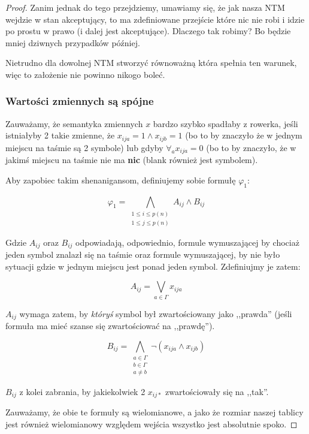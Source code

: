 \begin{proof}
    Zanim jednak do tego przejdziemy, umawiamy się, że jak nasza NTM wejdzie w stan akceptujący, to ma zdefiniowane przejście które nic nie robi i idzie po prostu w prawo (i dalej jest akceptujące). Dlaczego tak robimy? Bo będzie mniej dziwnych przypadków później. 
    
    Nietrudno dla dowolnej NTM stworzyć równoważną która spełnia ten warunek, więc to założenie nie powinno nikogo boleć. 
    
    \subsubsection{Wartości zmiennych są spójne}
        Zauważamy, że semantyka zmiennych \(x\) bardzo szybko spadłaby z rowerka, jeśli istniałyby 2 takie zmienne, że \(x_{ija} = 1 \land x_{ijb} = 1\) (bo to by znaczyło że w jednym miejscu na taśmie są 2 symbole) lub gdyby \( \forall_a x_{ija} = 0\) (bo to by znaczyło, że w jakimś miejscu na taśmie nie ma \textbf{nic} (blank również jest symbolem).
    
        Aby zapobiec takim shenanigansom, definiujemy sobie formułę \(\varphi_1\): 
        
        \[ 
            \varphi_1 = \bigwedge_{\substack{1 \leq i \leq p(n) \\ 1 \leq j \leq p(n)}} A_{ij} \land B_{ij}  
        \]
        
        Gdzie \(A_{ij}\) oraz \(B_{ij}\) odpowiadają, odpowiednio, formule wymuszającej by chociaż jeden symbol znalazł się na taśmie oraz formule wymuszającej, by nie było sytuacji gdzie w jednym miejscu jest ponad jeden symbol. Zdefiniujmy je zatem:
        
        \[ 
            A_{ij} = \bigvee_{a \in \Gamma} x_{ija}
        \]
        
        \(A_{ij}\) wymaga zatem, by \textit{któryś} symbol był zwartościowany jako ,,prawda'' (jeśli formuła ma mieć szanse się zwartościować na ,,prawdę''). 
        
        \[
            B_{ij} = \bigwedge_{\substack{a\in\Gamma \\ b\in\Gamma \\ a \not = b}} \neg(x_{ija} \land x_{ijb})
        \]
    
        \(B_{ij}\) z kolei zabrania, by jakiekolwiek 2 \(x_{ij*}\) zwartościowały się na ,,tak''. 
        
        Zauważamy, że obie te formuły są wielomianowe, a jako że rozmiar naszej tablicy jest również wielomianowy względem wejścia wszystko jest absolutnie spoko. 
    

\end{proof}
